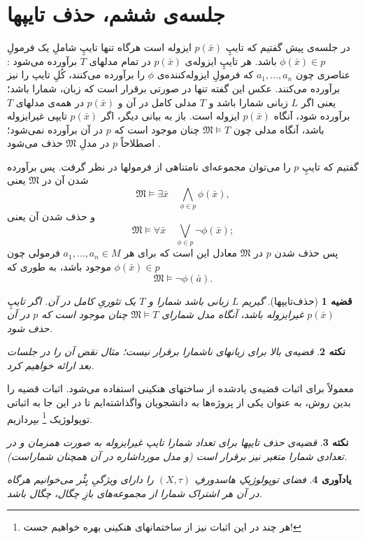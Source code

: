 \documentclass[12pt,a4paper]{report}
\theoremstyle{colorhead}
\newtheorem{thm}{قضیه}
\newtheorem{nokte}[thm]{نکته}
\newtheorem{yad}[thm]{یادآوری}
\begin{document}
\section{جلسه‌ی ششم، حذف تایپها}
در جلسه‌ی پیش گفتیم که تایپِ
$p(\bar{x})$
ایزوله است هرگاه تنها تایپِ شاملِ
یک فرمولِ
$\phi(\bar{x})\in p$
باشد.
هر تایپِ
ایزوله‌ی
$p(\bar{x})$
در تمام مدلهای
$T$
برآورده 
می‌شود
:
عناصری چون
$a_1,\ldots,a_n$
که فرمولِ
ایزوله‌کننده‌ی
$\phi$
را برآورده می‌کنند، کُلِ تایپ را نیز برآورده می‌کنند. عکس این گفته تنها در صورتی برقرار است که زبان، شمارا باشد؛ یعنی
اگر
$L$
زبانی شمارا باشد و 
$T$
مدلی کامل در آن و
$p(\bar{x})$
در همه‌ی مدلهای 
$T$
برآورده شود، آنگاه 
$p(\bar{x})$
ایزوله است. باز به بیانی دیگر، اگر
$p(\bar{x})$
تایپی غیرایزوله باشد، آنگاه مدلی
چون
$\mathfrak{M}\models T$
چنان موجود است که 
$p$
در آن برآورده نمی‌شود؛ اصطلاحاً
$p$
در مدلِ
$\mathfrak{M}$
حذف می‌شود
.
\par 
گفتیم که تایپِ
$p$
را می‌توان مجموعه‌ای نامتناهی از فرمولها در نظر گرفت. 
پس برآورده شدن آن در
$\mathfrak{M}$
یعنی
\[
\mathfrak{M}\models \exists \bar{x}\quad \bigwedge_{\phi\in p} \phi(\bar{x}),
\]
و حذف شدن آن یعنی
\[
\mathfrak{M}\models \forall\bar{x}\quad \bigvee_{\phi\in p}\neg \phi(\bar{x});
\]
پس حذف شدن 
$p$
در
$\mathfrak{M}$
معادل این است که برای هر
$a_1,\ldots,a_n\in M$
فرمولی چون
$\phi(\bar{x})\in p$
موجود باشد، به طوری که
\[
\mathfrak{M}\models  \neg \phi(\bar{a}).
\]
\begin{thm}[حذف‌تایپها]
گیریم
$L$
زبانی باشد شمارا و 
$T$
یک تئوریِ
کامل در آن. اگر تایپِ
$p(\bar{x})$
غیرایزوله باشد، آنگاه مدل شمارای 
$\mathfrak{M}\models T$
چنان موجود است که 
$p$
در آن حذف شود.
\end{thm}
\begin{nokte}
قضیه‌ی بالا برای زبانهای ناشمارا برقرار نیست؛ مثال نقض آن را در جلسات بعد ارائه خواهیم کرد. 
\end{nokte}
معمولاً برای اثبات قضیه‌ی یادشده از ساختهای هنکینی استفاده می‌شود. اثبات قضیه را بدین روش، 
به عنوان یکی از پروژه‌ها به دانشجویان واگذاشته‌ایم تا در این جا به اثباتی 
توپولوژیک 
\footnote{هر چند در این اثبات نیز از ساختمانهای هنکینی بهره خواهیم جست!}
بپردازیم. 
\begin{nokte}
قضیه‌ی حذف تایپها
برای تعداد شمارا تایپ غیرایزوله به صورت همزمان  و در تعدادی شمارا متغیر نیز برقرار است (و مدل مورداشاره‌ در آن همچنان شماراست).
\end{nokte}
\begin{yad}
فضای توپولوژیکِ هاسدورفِ
$(X,\tau)$
را دارای ویژگیِ
بِئْر
می‌خوانیم هرگاه در آن هر اشتراک شمارا از مجموعه‌های بازِ چگال، چگال باشد.
\end{yad}
\end{document}
